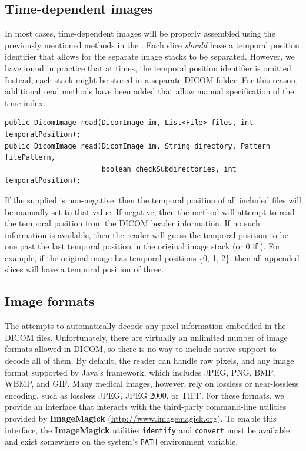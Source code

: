 \subsection{Time-dependent images}

In most cases, time-dependent images will be properly assembled using the previously mentioned
methods in the .  Each slice \emph{should} have a temporal position
identifier that allows for the separate image stacks to be separated.  However, we have found
in practice that at times, the temporal position identifier is omitted.  Instead, each stack
might be stored in a separate DICOM folder.  For this reason, additional read methods have
been added that allow manual specification of the time index:
\begin{lstlisting}[]
public DicomImage read(DicomImage im, List<File> files, int temporalPosition);
public DicomImage read(DicomImage im, String directory, Pattern filePattern, 
                       boolean checkSubdirectories, int temporalPosition);
\end{lstlisting}
If the supplied  is non-negative, then the temporal
position of all included files will be manually set to that value.  If negative,
then the method will attempt to read the temporal position from the DICOM header
information.  If no such information is available, then the reader will guess the 
temporal position to be one past the last temporal position in the original image
stack (or 0 if ).  For example, if the original
image has temporal positions \{0, 1, 2\}, then all appended slices will have
a temporal position of three.

\subsection{Image formats \label{sec:dicom:formats}}

The  attempts to automatically decode any pixel information 
embedded in the DICOM files.  Unfortunately, there are virtually an unlimited number
of image formats allowed in DICOM, so there is no way to include native
support to decode all of them.  By default, the reader can handle raw pixels,
and any image format supported by Java's  framework,
which includes JPEG, PNG, BMP, WBMP, and GIF.  Many medical images, however,
rely on lossless or near-lossless encoding, such as lossless JPEG, JPEG 2000, or TIFF.
For these formats, we provide an interface that interacts with the third-party
command-line utilities provided by \textbf{ImageMagick} (\url{http://www.imagemagick.org}).
To enable this interface, the \textbf{ImageMagick} utilities \texttt{identify} and 
\texttt{convert} must be available and exist somewhere on the system's \texttt{PATH}
environment variable.

